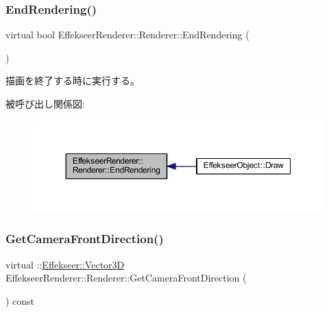 \subsubsection{\texorpdfstring{End\+Rendering()}{EndRendering()}}
{\footnotesize\ttfamily virtual bool Effekseer\+Renderer\+::\+Renderer\+::\+End\+Rendering (\begin{DoxyParamCaption}{ }\end{DoxyParamCaption})\hspace{0.3cm}{\ttfamily [pure virtual]}}



描画を終了する時に実行する。 

被呼び出し関係図\+:\nopagebreak
\begin{figure}[H]
\begin{center}
\leavevmode
\includegraphics[width=350pt]{class_effekseer_renderer_1_1_renderer_aaa6df6f62aead71652bdeb596d0a7ef4_icgraph}
\end{center}
\end{figure}
\mbox{\label{class_effekseer_renderer_1_1_renderer_a84c523a3a5fbcba9d8af3de01f8dfbfb}} 
\subsubsection{\texorpdfstring{Get\+Camera\+Front\+Direction()}{GetCameraFrontDirection()}}
{\footnotesize\ttfamily virtual \+::\mbox{\hyperlink{struct_effekseer_1_1_vector3_d}{Effekseer\+::\+Vector3D}} Effekseer\+Renderer\+::\+Renderer\+::\+Get\+Camera\+Front\+Direction (\begin{DoxyParamCaption}{ }\end{DoxyParamCaption}) const\hspace{0.3cm}{\ttfamily [pure virtual]}}



